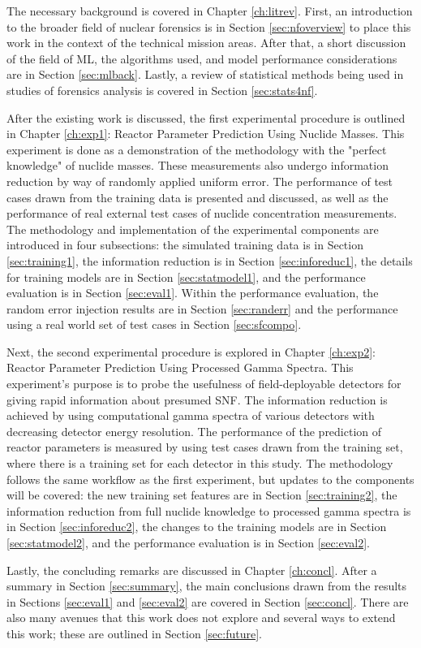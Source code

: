 The necessary background is covered in Chapter \ref{ch:litrev}.  First, an
introduction to the broader field of nuclear forensics is in Section
\ref{sec:nfoverview} to place this work in the context of the technical mission
areas. After that, a short discussion of the field of \gls{ML}, the algorithms
used, and model performance considerations are in Section \ref{sec:mlback}.
Lastly, a review of statistical methods being used in studies of forensics
analysis is covered in Section \ref{sec:stats4nf}. 

After the existing work is discussed, the first experimental procedure is
outlined in Chapter \ref{ch:exp1}: Reactor Parameter Prediction Using Nuclide
Masses.  This experiment is done as a demonstration of the methodology with the
"perfect knowledge" of nuclide masses. These measurements also undergo
information reduction by way of randomly applied uniform error. The performance
of test cases drawn from the training data is presented and discussed, as well
as the performance of real external test cases of nuclide concentration
measurements.  The methodology and implementation of the experimental
components are introduced in four subsections: the simulated training data is
in Section \ref{sec:training1}, the information reduction is in Section
\ref{sec:inforeduc1}, the details for training models are in Section
\ref{sec:statmodel1}, and the performance evaluation is in Section
\ref{sec:eval1}. Within the performance evaluation, the random error injection
results are in Section \ref{sec:randerr} and the performance using a real world
set of test cases in Section \ref{sec:sfcompo}.

Next, the second experimental procedure is explored in Chapter \ref{ch:exp2}:
Reactor Parameter Prediction Using Processed Gamma Spectra.  This experiment's
purpose is to probe the usefulness of field-deployable detectors for giving
rapid information about presumed \gls{SNF}. The information reduction is
achieved by using computational gamma spectra of various detectors with
decreasing detector energy resolution.  The performance of the prediction of
reactor parameters is measured by using test cases drawn from the training set,
where there is a training set for each detector in this study.  The methodology
follows the same workflow as the first experiment, but updates to the
components will be covered: the new training set features are in Section
\ref{sec:training2}, the information reduction from full nuclide knowledge to
processed gamma spectra is in Section \ref{sec:inforeduc2}, the changes to the
training models are in Section \ref{sec:statmodel2}, and the performance
evaluation is in Section \ref{sec:eval2}.

Lastly, the concluding remarks are discussed in Chapter \ref{ch:concl}. After a
summary in Section \ref{sec:summary}, the main conclusions drawn from the results
in Sections \ref{sec:eval1} and \ref{sec:eval2} are covered in Section
\ref{sec:concl}. There are also many avenues that this work does not explore
and several ways to extend this work; these are outlined in Section
\ref{sec:future}.
